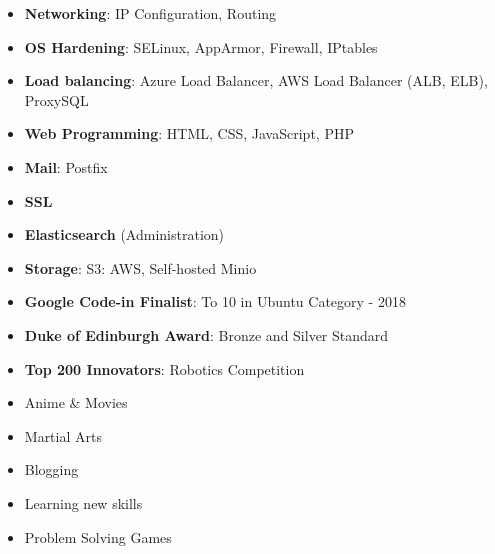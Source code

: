 \documentclass[10pt,a4paper,ragged2e,withhyper]{altacv}
\begin{document}
\begin{paracol}{2}
\begin{itemize}[left=0pt]
    \item \textbf{\textcolor{PastelRed}{Networking}}: IP Configuration, Routing
    \item \textbf{\textcolor{PastelRed}{OS Hardening}}: SELinux, AppArmor, Firewall, IPtables
    \item \textbf{\textcolor{PastelRed}{Load balancing}}: Azure Load Balancer, AWS Load Balancer (ALB, ELB), ProxySQL
    \item \textbf{\textcolor{PastelRed}{Web Programming}}: HTML, CSS, JavaScript, PHP
    \item \textbf{\textcolor{PastelRed}{Mail}}: Postfix
    \item \textbf{\textcolor{PastelRed}{SSL}}
    \item \textbf{\textcolor{PastelRed}{Elasticsearch}} (Administration)
    \item \textbf{\textcolor{PastelRed}{Storage}}: S3: AWS, Self-hosted Minio
\end{itemize}

\switchcolumn


\begin{itemize}[left=0pt]
    \item \textbf{\textcolor{DarkPastelRed}{Google Code-in Finalist}}: To 10 in Ubuntu Category - 2018
    \item \textbf{\textcolor{DarkPastelRed}{Duke of Edinburgh Award}}: Bronze and Silver Standard
    \item \textbf{\textcolor{DarkPastelRed}{Top 200 Innovators}}: Robotics Competition
\end{itemize}


\begin{multicols}{2}
\begin{itemize}[label=\textcolor{DarkPastelRed}{$\triangleright$}]
\item Anime \& Movies
\item Martial Arts
\item Blogging
\item Learning new skills
\item Problem Solving Games
\end{itemize}
\end{multicols}

\end{paracol}
\end{document}
